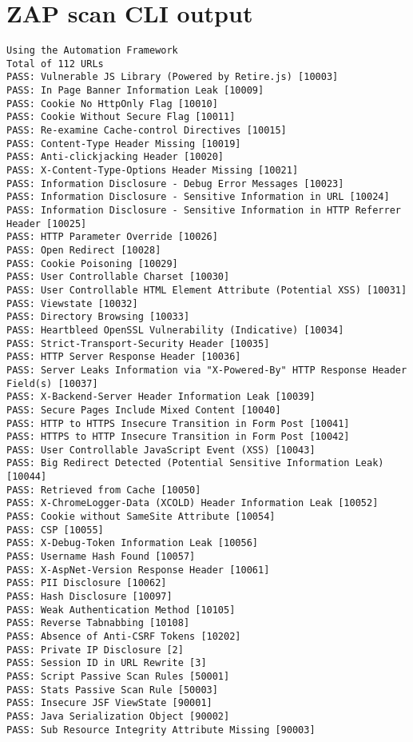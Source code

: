 \section{ZAP scan CLI output}
\vspace{2mm}
\begin{lstlisting}[caption=OWASP ZAP baseline scan, captionpos=b, frame=single, label={owasp-zap-cli-full-output}]
Using the Automation Framework
Total of 112 URLs
PASS: Vulnerable JS Library (Powered by Retire.js) [10003]
PASS: In Page Banner Information Leak [10009]
PASS: Cookie No HttpOnly Flag [10010]
PASS: Cookie Without Secure Flag [10011]
PASS: Re-examine Cache-control Directives [10015]
PASS: Content-Type Header Missing [10019]
PASS: Anti-clickjacking Header [10020]
PASS: X-Content-Type-Options Header Missing [10021]
PASS: Information Disclosure - Debug Error Messages [10023]
PASS: Information Disclosure - Sensitive Information in URL [10024]
PASS: Information Disclosure - Sensitive Information in HTTP Referrer Header [10025]
PASS: HTTP Parameter Override [10026]
PASS: Open Redirect [10028]
PASS: Cookie Poisoning [10029]
PASS: User Controllable Charset [10030]
PASS: User Controllable HTML Element Attribute (Potential XSS) [10031]
PASS: Viewstate [10032]
PASS: Directory Browsing [10033]
PASS: Heartbleed OpenSSL Vulnerability (Indicative) [10034]
PASS: Strict-Transport-Security Header [10035]
PASS: HTTP Server Response Header [10036]
PASS: Server Leaks Information via "X-Powered-By" HTTP Response Header Field(s) [10037]
PASS: X-Backend-Server Header Information Leak [10039]
PASS: Secure Pages Include Mixed Content [10040]
PASS: HTTP to HTTPS Insecure Transition in Form Post [10041]
PASS: HTTPS to HTTP Insecure Transition in Form Post [10042]
PASS: User Controllable JavaScript Event (XSS) [10043]
PASS: Big Redirect Detected (Potential Sensitive Information Leak) [10044]
PASS: Retrieved from Cache [10050]
PASS: X-ChromeLogger-Data (XCOLD) Header Information Leak [10052]
PASS: Cookie without SameSite Attribute [10054]
PASS: CSP [10055]
PASS: X-Debug-Token Information Leak [10056]
PASS: Username Hash Found [10057]
PASS: X-AspNet-Version Response Header [10061]
PASS: PII Disclosure [10062]
PASS: Hash Disclosure [10097]
PASS: Weak Authentication Method [10105]
PASS: Reverse Tabnabbing [10108]
PASS: Absence of Anti-CSRF Tokens [10202]
PASS: Private IP Disclosure [2]
PASS: Session ID in URL Rewrite [3]
PASS: Script Passive Scan Rules [50001]
PASS: Stats Passive Scan Rule [50003]
PASS: Insecure JSF ViewState [90001]
PASS: Java Serialization Object [90002]
PASS: Sub Resource Integrity Attribute Missing [90003]

\end{lstlisting}
